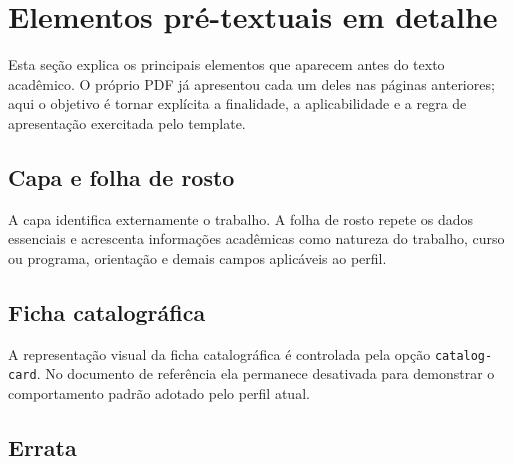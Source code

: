 \section{Elementos pré-textuais em detalhe}\label{sec:pretextuais-detalhe}

Esta seção explica os principais elementos que aparecem antes do texto acadêmico. O próprio PDF já apresentou cada um deles nas páginas anteriores; aqui o objetivo é tornar explícita a finalidade, a aplicabilidade e a regra de apresentação exercitada pelo template.

\subsection{Capa e folha de rosto}

A capa identifica externamente o trabalho. A folha de rosto repete os dados essenciais e acrescenta informações acadêmicas como natureza do trabalho, curso ou programa, orientação e demais campos aplicáveis ao perfil.



\subsection{Ficha catalográfica}

A representação visual da ficha catalográfica é controlada pela opção \texttt{catalog-card}. No documento de referência ela permanece desativada para demonstrar o comportamento padrão adotado pelo perfil atual.


\subsection{Errata}

